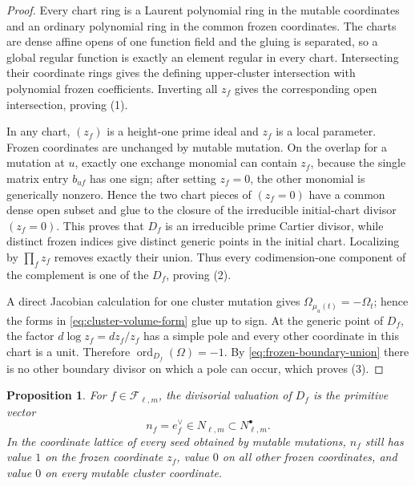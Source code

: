 \documentclass[11pt]{amsart}
\newtheorem{proposition}[theorem]{Proposition}
\theoremstyle{definition}
\theoremstyle{remark}
\begin{document}
\begin{proof}
Every chart ring is a Laurent polynomial ring in the mutable coordinates
and an ordinary polynomial ring in the common frozen coordinates.  The
charts are dense affine opens of one function field and the gluing is
separated, so a global regular function is exactly an element regular in
every chart.  Intersecting their coordinate rings gives the defining
upper-cluster intersection with polynomial frozen coefficients.  Inverting
all $z_f$ gives the corresponding open intersection, proving (1).

In any chart, $(z_f)$ is a height-one prime ideal and $z_f$ is a local
parameter.  Frozen coordinates are unchanged by mutable mutation.  On the
overlap for a mutation at $u$, exactly one exchange monomial can contain
$z_f$, because the single matrix entry $b_{uf}$ has one sign; after setting
$z_f=0$, the other monomial is generically nonzero.  Hence the two chart
pieces of $(z_f=0)$ have a common dense open subset and glue to the closure
of the irreducible initial-chart divisor $(z_f=0)$.  This proves that $D_f$
is an irreducible prime Cartier divisor, while distinct frozen indices give
distinct generic points in the initial chart.  Localizing by $\prod_fz_f$
removes exactly their union.  Thus every codimension-one component of the
complement is one of the $D_f$, proving (2).

A direct Jacobian calculation for one cluster mutation gives
$\Omega_{\mu_u(t)}=-\Omega_t$; hence the forms in
\eqref{eq:cluster-volume-form} glue up to sign.  At the generic point of
$D_f$, the factor $d\log z_f=dz_f/z_f$ has a simple pole and every other
coordinate in this chart is a unit.  Therefore
$\operatorname{ord}_{D_f}(\Omega)=-1$.  By
\eqref{eq:frozen-boundary-union} there is no other boundary divisor on
which a pole can occur, which proves (3).
\end{proof}

\begin{proposition}\label{prop:primitive-frozen-valuations}
For $f\in\mathscr F_{\ell,m}$, the divisorial valuation of $D_f$ is the
primitive vector
\[ n_f=e_f^\vee\in N_{\ell,m}\subset N_{\ell,m}^{\bullet}. \]
In the coordinate lattice of every seed obtained by mutable mutations,
$n_f$ still has value $1$ on the frozen coordinate $z_f$, value $0$ on all
other frozen coordinates, and value $0$ on every mutable cluster
coordinate.
\end{proposition}
\end{document}
